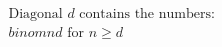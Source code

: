 \documentclass[preview]{standalone}
\begin{document}
\begin{align*}
\text{Diagonal } d \text{ contains the numbers: } \\binom{n}{d} \text{ for } n \geq d
\end{align*}
\end{document}
